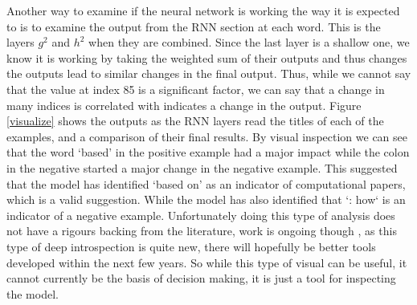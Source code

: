\documentclass[12pt, a4paper]{article}
\begin{document}
Another way to examine if the neural network is working the way it is expected to is to examine the output from the RNN section at each word. This is the layers $g^2$ and $h^2$ when they are combined. Since the last layer is a shallow one, we know it is working by taking the weighted sum of their outputs and thus changes the outputs lead to similar changes in the final output. Thus, while we cannot say that the value at index 85 is a significant factor, we can say that a change in many indices is correlated with  indicates a change in the output. Figure \ref{visualize} shows the outputs as the RNN layers read the titles of each of the examples, and a comparison of their final results. By visual inspection we can see that the word `based' in the positive example had a major impact while the colon in the negative started a major change in the negative example. This suggested that the model has identified `based on' as an indicator of computational papers, which is a valid suggestion. While the model has also identified that `: how` is an indicator of a negative example. Unfortunately doing this type of analysis does not have a rigours backing from the literature, work is ongoing though \citep{strobelt2018lstmvis}, as this type of deep introspection is quite new, there will hopefully be better tools developed within the next few years. So while this type of visual can be useful, it cannot currently be the basis of decision making, it is just a tool for inspecting the model.
\end{document}
